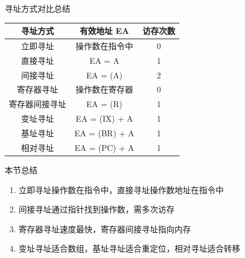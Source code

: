 \documentclass[10pt, aspectratio=169]{beamer}
\begin{document}
\begin{frame}{寻址方式对比总结}
    \begin{center}
        \begin{tabular}{|c|c|c|}
            \hline
            \textbf{寻址方式} & \textbf{有效地址 EA} & \textbf{访存次数} \\
            \hline
            立即寻址   & 操作数在指令中 & 0 \\
            直接寻址   & EA = A & 1 \\
            间接寻址   & EA = (A) & 2 \\
            寄存器寻址   & 操作数在寄存器 & 0 \\
            寄存器间接寻址 & EA = (R) & 1 \\
            变址寻址   & EA = (IX) + A & 1 \\
            基址寻址   & EA = (BR) + A & 1 \\
            相对寻址   & EA = (PC) + A & 1 \\
            \hline
        \end{tabular}
    \end{center}
\end{frame}

\begin{frame}{本节总结}
    \begin{enumerate}
        \item 立即寻址操作数在指令中，直接寻址操作数地址在指令中
        \item 间接寻址通过指针找到操作数，需多次访存
        \item 寄存器寻址速度最快，寄存器间接寻址指向内存
        \item 变址寻址适合数组，基址寻址适合重定位，相对寻址适合转移
    \end{enumerate}
\end{frame}
\end{document}
